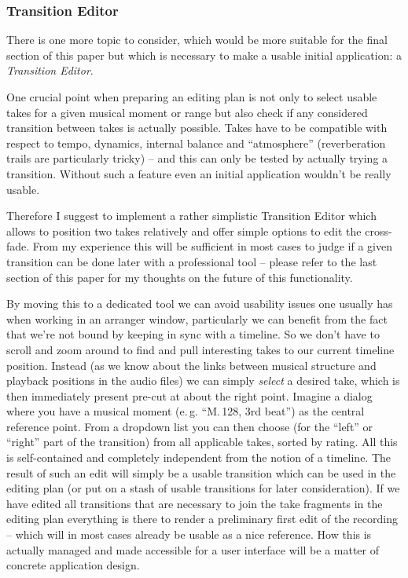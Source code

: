 \documentclass[11pt,a4paper]{article}
\begin{document}
\subsubsection{Transition Editor}
There is one more topic to consider, which would be more suitable for the final section of this paper but which is necessary to make a usable initial application: a \emph{Transition Editor}.

One crucial point when preparing an editing plan is not only to select usable takes for a given musical moment or range but also check if any considered transition between takes is actually possible.
Takes have to be compatible with respect to tempo, dynamics, internal balance and “atmosphere” (reverberation trails are particularly tricky) -- and this can only be tested by actually trying a transition.
Without such a feature even an initial application wouldn't be really usable.

Therefore I suggest to implement a rather simplistic Transition Editor which allows to position two takes relatively and offer simple options to edit the cross-fade.
From my experience this will be sufficient in most cases to judge if a given transition can be done later with a professional tool -- please refer to the last section of this paper for my thoughts on the future of this functionality.

By moving this to a dedicated tool we can avoid usability issues one usually has when working in an arranger window, particularly we can benefit from the fact that we're not bound by keeping in sync with a timeline.
So we don't have to scroll and zoom around to find and pull interesting takes to our current timeline position.
Instead (as we know about the links between musical structure and playback positions in the audio files) we can simply \emph{select} a desired take, which is then immediately present pre-cut at about the right point.
Imagine a dialog where you have a musical moment (e.\,g. “M.\,128, 3rd beat”) as the central reference point.
From a dropdown list you can then choose (for the “left” or “right” part of the transition) from all applicable takes, sorted by rating.
All this is self-contained and completely independent from the notion of a timeline.
The result of such an edit will simply be a usable transition which can be used in the editing plan (or put on a stash of usable transitions for later consideration).
If we have edited all transitions that are necessary to join the take fragments in the editing plan everything is there to render a preliminary first edit of the recording -- which will in most cases already be usable as a nice reference.
How this is actually managed and made accessible for a user interface will be a matter of concrete application design.
\end{document}

